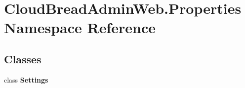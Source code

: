 \hypertarget{a00423}{}\section{Cloud\+Bread\+Admin\+Web.\+Properties Namespace Reference}
\label{a00423}
\subsection*{Classes}
\begin{DoxyCompactItemize}
\item 
class {\bfseries Settings}
\end{DoxyCompactItemize}
